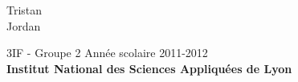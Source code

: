 \documentclass[a4paper,french,10pt,twoside]{article}
\begin{document}
\vspace{1cm}

\begin{center}
  \Large \textbf{}\\
\end{center}

\begin{center}
	\vspace*{3cm}
	\LARGE {}\\ \vspace{10pt}\large \color{black} Tristan  \\ Jordan  \\
				   \vspace*{1.5cm}

				   \vspace*{1cm}

				   \Large 3IF - Groupe 2 \hfill Ann\'ee scolaire 2011-2012\\
				   \vspace*{1cm}
				   \textbf{\Large Institut National des Sciences Appliqu\'{e}es de Lyon} \pagebreak
\end{center}
\end{document}
